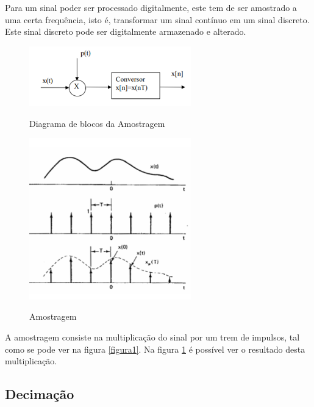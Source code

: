 \documentclass[11pt]{article}
\begin{document}
Para um sinal poder ser processado digitalmente, este tem de ser amostrado a uma certa frequência, isto é, transformar um sinal contínuo em um sinal discreto. Este sinal discreto pode ser digitalmente armazenado e alterado.
\begin{figure}[!h]
\begin{center}
\includegraphics[width=7cm]{amostragem1.PNG}
\caption{Diagrama de blocos da Amostragem}
\label{figura1}
\includegraphics[width=7cm]{amostragem2.PNG}
\caption{Amostragem}
\label{figura2}
\end{center}
\end{figure}

A amostragem consiste na multiplicação do sinal por um trem de impulsos, tal como se pode ver na figura \ref{figura1}.
Na figura \ref{figura2} é possível ver o resultado desta multiplicação.
\subsection{Decimação}
\end{document}
